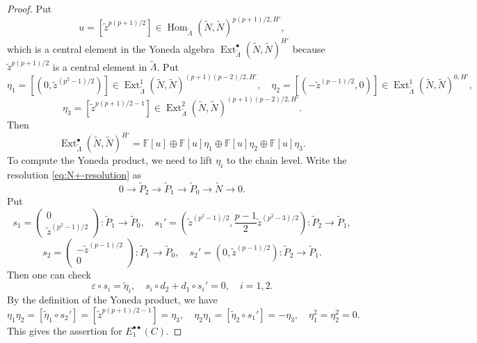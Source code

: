 \documentclass[11pt,a4paper]{article} %
\def\FF{\mathbb{F}}
\def\Ext{\operatorname{Ext}} %
\def\Hom{\operatorname{Hom}}
\begin{document}
\begin{proof}
    Put 
    \[
    u=[\widetilde{z}^{p(p+1)/2}]\in\Hom_{\widetilde{\Lambda}}(\widetilde{N},\widetilde{N})^{p(p+1)/2,H'},
    \] 
    which is a central element in the Yoneda algebra $\Ext^\bullet_{\widetilde{\Lambda}}(\widetilde{N},\widetilde{N})^{H'}$ because $\widetilde{z}^{p(p+1)/2}$ is a central element in $\widetilde{\Lambda}$. Put 
    \[
    \eta_1=[(0,\widetilde{z}^{(p^2-1)/2})]\in\Ext_{\widetilde{\Lambda}}^1(\widetilde{N},\widetilde{N})^{(p+1)(p-2)/2,H'},\quad\eta_2=[(-\widetilde{z}^{(p-1)/2},0)]\in\Ext_{\widetilde{\Lambda}}^1(\widetilde{N},\widetilde{N})^{0,H'},
    \]
    \[
    \eta_3=[\widetilde{z}^{p(p+1)/2-1}]\in\Ext_{\widetilde{\Lambda}}^2(\widetilde{N},\widetilde{N})^{(p+1)(p-2)/2,H'}.
    \]
    Then 
    \[
    \Ext^\bullet_{\widetilde{\Lambda}}(\widetilde{N},\widetilde{N})^{H'}=\FF[u]\oplus\FF[u]\eta_1\oplus\FF[u]\eta_2\oplus\FF[u]\eta_3.
    \]
    To compute the Yoneda product, we need to lift $\eta_i$ to the chain level. Write the resolution \eqref{eq:N+-resolution} as
    \[
    0\longrightarrow\widetilde{P}_2\longrightarrow\widetilde{P}_1\longrightarrow\widetilde{P}_0\longrightarrow\widetilde{N}\longrightarrow0.
    \]
    Put
    \[
    s_1=
    \begin{pmatrix}
        0 \\
        \widetilde{z}^{(p^2-1)/2}
    \end{pmatrix}
    :\widetilde{P}_1\rightarrow\widetilde{P}_0,
    \quad
    s_1'=(\widetilde{z}^{(p^2-1)/2},\frac{p-1}{2}\widetilde{z}^{(p^2-3)/2}):\widetilde{P}_2\rightarrow\widetilde{P}_1,
    \]
    \[
    s_2=
    \begin{pmatrix}
        -\widetilde{z}^{(p-1)/2} \\
        0
    \end{pmatrix}
    :\widetilde{P}_1\rightarrow\widetilde{P}_0,
    \quad
    s_2'=(0,\widetilde{z}^{(p-1)/2}):\widetilde{P}_2\rightarrow\widetilde{P}_1.
    \]
    Then one can check
    \[
    \varepsilon\circ s_i=\widetilde{\eta}_i,\quad s_i\circ d_2+d_1\circ s_i'=0,\quad i=1,2.
    \]
    By the definition of the Yoneda product, we have
    \[
    \eta_1\eta_2=[\widetilde{\eta}_1\circ s_2']=[\widetilde{z}^{p(p+1)/2-1}]=\eta_3,\quad\eta_2\eta_1=[\widetilde{\eta}_2\circ s_1']=-\eta_3,\quad\eta_1^2=\eta_2^2=0.
    \]
    This gives the assertion for $E_1^{\bullet\bullet}(C)$. 
    

\end{proof}
\end{document}
